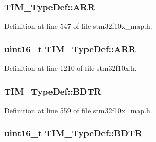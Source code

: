 \subsubsection[{\texorpdfstring{A\+RR}{ARR}}]{ T\+I\+M\+\_\+\+Type\+Def\+::\+A\+RR}\hypertarget{struct_t_i_m___type_def_a1d7fa3dbbc8b0efd7912d9c62f24c97b}{}\label{struct_t_i_m___type_def_a1d7fa3dbbc8b0efd7912d9c62f24c97b}


Definition at line 547 of file stm32f10x\+\_\+map.\+h.

\subsubsection[{\texorpdfstring{A\+RR}{ARR}}]{ {\bf uint16\+\_\+t} T\+I\+M\+\_\+\+Type\+Def\+::\+A\+RR}\hypertarget{struct_t_i_m___type_def_a32ceda49b331ef9f61567ef9ffdf045e}{}\label{struct_t_i_m___type_def_a32ceda49b331ef9f61567ef9ffdf045e}


Definition at line 1210 of file stm32f10x.\+h.

\subsubsection[{\texorpdfstring{B\+D\+TR}{BDTR}}]{ T\+I\+M\+\_\+\+Type\+Def\+::\+B\+D\+TR}\hypertarget{struct_t_i_m___type_def_a2102e247245928fd103c6f6688506fbf}{}\label{struct_t_i_m___type_def_a2102e247245928fd103c6f6688506fbf}


Definition at line 559 of file stm32f10x\+\_\+map.\+h.

\subsubsection[{\texorpdfstring{B\+D\+TR}{BDTR}}]{ {\bf uint16\+\_\+t} T\+I\+M\+\_\+\+Type\+Def\+::\+B\+D\+TR}\hypertarget{struct_t_i_m___type_def_a32bbedb8b418359c6873375ec949cf8b}{}\label{struct_t_i_m___type_def_a32bbedb8b418359c6873375ec949cf8b}


